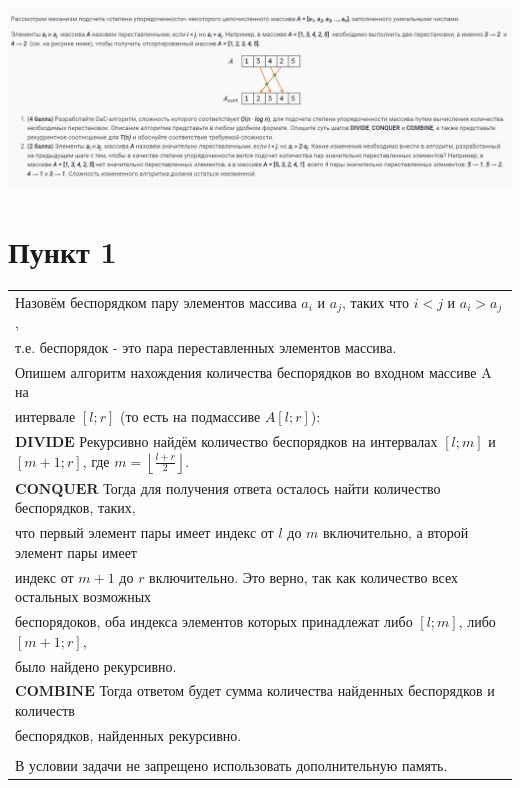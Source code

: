 \documentclass[11pt,a4paper]{article} %
\def \flr#1{\left\lfloor #1 \right\rfloor}
\begin{document}
\hspace{-1.5cm} \includegraphics[scale=0.60]{a4_df.png}
\section*{Пункт 1}

\begin{tabular}{l}
    Назовём $ \textit{беспорядком} $ пару элементов массива $ a_i $ и $ a_j $, таких что $ i < j $ и $ a_i > a_j $, \\
    т.е. $ \textit{беспорядок} $ - это пара $ \textit{переставленных} $ элементов массива. \\
    Опишем алгоритм нахождения количества $ \textit{беспорядков} $ во входном массиве A на \\
    интервале $ [l; r] $ (то есть на подмассиве $ A[l; r] $): \\
    $ \textbf{DIVIDE} $ Рекурсивно найдём количество $ \textit{беспорядков} $ на интервалах $ [l; m] $ и $ [m + 1; r] $, где $ m = \flr{\frac{l + r}{2}} $. \\
    $ \textbf{CONQUER} $ Тогда для получения ответа осталось найти количество $ \textit{беспорядков} $, таких, \\
    что первый элемент пары имеет индекс от $ l $ до $ m $ включительно, а второй элемент пары имеет \\
    индекс от $ m + 1 $ до $ r $ включительно. Это верно, так как количество всех остальных возможных \\
    $ \textit{беспорядоков} $, оба индекса элементов которых принадлежат либо $ [l; m] $, либо $ [m + 1; r] $, \\
    было найдено рекурсивно. \\
    $ \textbf{COMBINE} $ Тогда ответом будет сумма количества найденных $ \textit{беспорядков} $ и количеств \\
    $ \textit{беспорядков} $, найденных рекурсивно. \\
    \\
    В условии задачи не запрещено использовать дополнительную память. \\

\end{tabular}
\end{document}
